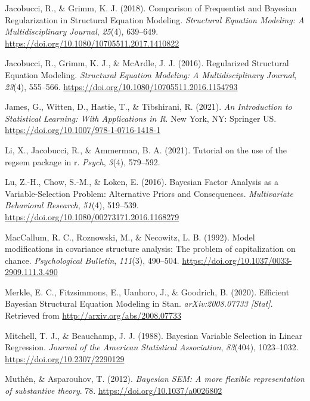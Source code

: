 \documentclass[
  man, donotrepeattitle,floatsintext]{apa6}
\newlength{\cslhangindent}
\newenvironment{CSLReferences}[2] %
 {\begin{list}{}{%
  \setlength{\itemindent}{0pt}
  \setlength{\leftmargin}{0pt}
  \setlength{\parsep}{0pt}
  \ifodd #1
   \setlength{\leftmargin}{\cslhangindent}
   \setlength{\itemindent}{-1\cslhangindent}
  \fi
  \setlength{\itemsep}{#2\baselineskip}}}
 {\end{list}}
\begin{document}
\begin{CSLReferences}{1}{0}
Jacobucci, R., \& Grimm, K. J. (2018). Comparison of {Frequentist} and {Bayesian} {Regularization} in {Structural} {Equation} {Modeling}. \emph{Structural Equation Modeling: A Multidisciplinary Journal}, \emph{25}(4), 639--649. \url{https://doi.org/10.1080/10705511.2017.1410822}

Jacobucci, R., Grimm, K. J., \& McArdle, J. J. (2016). Regularized {Structural} {Equation} {Modeling}. \emph{Structural Equation Modeling: A Multidisciplinary Journal}, \emph{23}(4), 555--566. \url{https://doi.org/10.1080/10705511.2016.1154793}

James, G., Witten, D., Hastie, T., \& Tibshirani, R. (2021). \emph{An {Introduction} to {Statistical} {Learning}: With {Applications} in {R}}. New York, NY: Springer US. \url{https://doi.org/10.1007/978-1-0716-1418-1}

Li, X., Jacobucci, R., \& Ammerman, B. A. (2021). Tutorial on the use of the regsem package in r. \emph{Psych}, \emph{3}(4), 579--592.

Lu, Z.-H., Chow, S.-M., \& Loken, E. (2016). Bayesian {Factor} {Analysis} as a {Variable}-{Selection} {Problem}: {Alternative} {Priors} and {Consequences}. \emph{Multivariate Behavioral Research}, \emph{51}(4), 519--539. \url{https://doi.org/10.1080/00273171.2016.1168279}

MacCallum, R. C., Roznowski, M., \& Necowitz, L. B. (1992). Model modifications in covariance structure analysis: The problem of capitalization on chance. \emph{Psychological Bulletin}, \emph{111}(3), 490--504. \url{https://doi.org/10.1037/0033-2909.111.3.490}

Merkle, E. C., Fitzsimmons, E., Uanhoro, J., \& Goodrich, B. (2020). Efficient {Bayesian} {Structural} {Equation} {Modeling} in {Stan}. \emph{arXiv:2008.07733 {[}Stat{]}}. Retrieved from \url{http://arxiv.org/abs/2008.07733}

Mitchell, T. J., \& Beauchamp, J. J. (1988). Bayesian {Variable} {Selection} in {Linear} {Regression}. \emph{Journal of the American Statistical Association}, \emph{83}(404), 1023--1032. \url{https://doi.org/10.2307/2290129}

Muthén, \& Asparouhov, T. (2012). \emph{Bayesian {SEM}: {A} more ﬂexible representation of substantive theory}. 78. \url{https://doi.org/10.1037/a0026802}


\end{CSLReferences}
\end{document}
